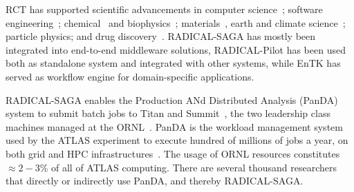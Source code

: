 \documentclass[preprint,12pt, a4paper]{elsarticle}
\begin{document}

RCT has supported scientific advancements in computer
science~\cite{merzky2018synapse}; software
engineering~\cite{turilli2019middleware}; chemical~\cite{sampat2018parallel} and
biophysics~\cite{shkurti2016coco,dakka2018high}; materials~\cite{dakka2018high},
earth and climate
science~\cite{paraskevakos2019workflow,balasubramanian2018harnessing}; particle
physics\cite{oleynik2017high}; and drug discovery~\cite{bfe-jctc-2014}.
RADICAL-SAGA has mostly been integrated into end-to-end middleware solutions,
RADICAL-Pilot has been used both as standalone system and integrated with other
systems, while EnTK has served as workflow engine for domain-specific
applications.

RADICAL-SAGA enables the Production ANd Distributed Analysis (PanDA) system to
submit batch jobs to Titan and Summit~\cite{megino2017integration}, the two
leadership class machines managed at the ORNL~\cite{web-olcf-resources}. PanDA
is the workload management system used by the ATLAS experiment to execute
hundred of millions of jobs a year, on both grid and HPC
infrastructures~\cite{maeno2008panda}. The usage of ORNL resources constitutes
$\approx 2-3$\% of all of ATLAS computing. There are several thousand
researchers that directly or indirectly use PanDA, and thereby RADICAL-SAGA.


\end{document}

